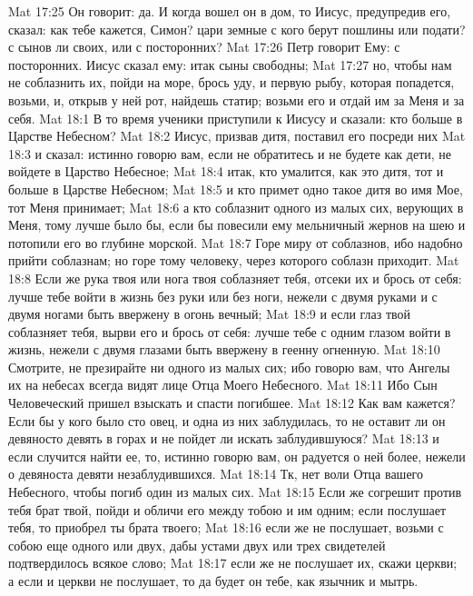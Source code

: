 \vs Mat 17:25 Он говорит: да. И когда вошел он в дом, то Иисус, предупредив его, сказал: как тебе кажется, Симон? цари земные с кого берут пошлины или подати? с сынов ли своих, или с посторонних?
\vs Mat 17:26 Петр говорит Ему: с посторонних. Иисус сказал ему: итак сыны свободны;
\vs Mat 17:27 но, чтобы нам не соблазнить их, пойди на море, брось уду, и первую рыбу, которая попадется, возьми, и, открыв у ней рот, найдешь статир; возьми его и отдай им за Меня и за себя.
\vs Mat 18:1 В то время ученики приступили к Иисусу и сказали: кто больше в Царстве Небесном?
\vs Mat 18:2 Иисус, призвав дитя, поставил его посреди них
\vs Mat 18:3 и сказал: истинно говорю вам, если не обратитесь и не будете как дети, не войдете в Царство Небесное;
\vs Mat 18:4 итак, кто умалится, как это дитя, тот и больше в Царстве Небесном;
\vs Mat 18:5 и кто примет одно такое дитя во имя Мое, тот Меня принимает;
\vs Mat 18:6 а кто соблазнит одного из малых сих, верующих в Меня, тому лучше было бы, если бы повесили ему мельничный жернов на шею и потопили его во глубине морской.
\vs Mat 18:7 Горе миру от соблазнов, ибо надобно прийти соблазнам; но горе тому человеку, через которого соблазн приходит.
\vs Mat 18:8 Если же рука твоя или нога твоя соблазняет тебя, отсеки их и брось от себя: лучше тебе войти в жизнь без руки или без ноги, нежели с двумя руками и с двумя ногами быть ввержену в огонь вечный;
\vs Mat 18:9 и если глаз твой соблазняет тебя, вырви его и брось от себя: лучше тебе с одним глазом войти в жизнь, нежели с двумя глазами быть ввержену в геенну огненную.
\rsbpar\vs Mat 18:10 Смотрите, не презирайте ни одного из малых сих; ибо говорю вам, что Ангелы их на небесах всегда видят лице Отца Моего Небесного.
\vs Mat 18:11 Ибо Сын Человеческий пришел взыскать и спасти погибшее.
\vs Mat 18:12 Как вам кажется? Если бы у кого было сто овец, и одна из них заблудилась, то не оставит ли он девяносто девять в горах и не пойдет ли искать заблудившуюся?
\vs Mat 18:13 и если случится найти ее, то, истинно говорю вам, он радуется о ней более, нежели о девяноста девяти незаблудившихся.
\vs Mat 18:14 Тк, нет воли Отца вашего Небесного, чтобы погиб один из малых сих.
\rsbpar\vs Mat 18:15 Если же согрешит против тебя брат твой, пойди и обличи его между тобою и им одним; если послушает тебя, то приобрел ты брата твоего;
\vs Mat 18:16 если же не послушает, возьми с собою еще одного или двух, дабы устами двух или трех свидетелей подтвердилось всякое слово;
\vs Mat 18:17 если же не послушает их, скажи церкви; а если и церкви не послушает, то да будет он тебе, как язычник и мытрь.
